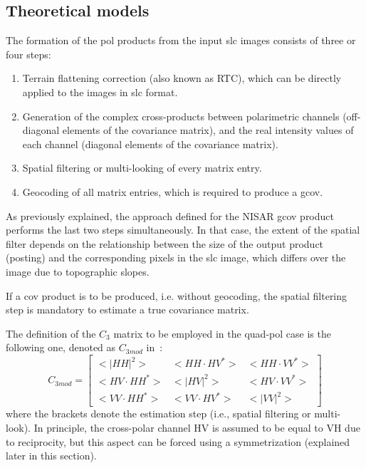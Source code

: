 

\subsection{Theoretical models}
\label{sec:pol_models}


The formation of the \acs{pol} products from the input \acs{slc} images consists of three or four steps:
\begin{enumerate}
\item Terrain flattening correction (also known as RTC), which can be directly applied to the images in \acs{slc} format.
\item Generation of the complex cross-products between polarimetric channels (off-diagonal elements of the covariance matrix), and the real intensity values of each channel (diagonal elements of the covariance matrix).
\item Spatial filtering or multi-looking of every matrix entry.
\item Geocoding of all matrix entries, which is required to produce a \acs{gcov}. 
\end{enumerate}

As previously explained, the approach defined for the NISAR \acs{gcov} product~\cite{NISAR_GCOV_ProdSpec} performs the last two steps simultaneously. In that case, the extent of the spatial filter depends on the relationship between the size of the output product (posting) and the corresponding pixels in the \acs{slc} image, which differs over the image due to topographic slopes.

If a \acs{cov} product is to be produced, i.e. without geocoding, the spatial filtering step is mandatory to 
estimate a true covariance matrix.

The definition of the $C_3$ matrix to be employed in the quad-pol case is the following one, denoted as $C_{3mod}$ in~\cite{CEOS-ARD_PFS_POLSAR}:
\begin{equation}
    C_{3mod} =
    \begin{bmatrix}
    <|HH|^2>         &  <HH  \cdot HV^*> &    <HH  \cdot VV^*> \\
    <HV  \cdot HH^*> &  <|HV|^2>         &    <HV  \cdot VV^*> \\
    <VV  \cdot HH^*> &  <VV  \cdot HV^*> &     <|VV|^2>
    \end{bmatrix} \label{eq:C3mod}
\end{equation}
where the brackets denote the estimation step (i.e., spatial filtering or multi-look). In principle, the cross-polar channel HV is assumed to be equal to VH due to reciprocity, but this aspect can be forced using a symmetrization (explained later in this section).

